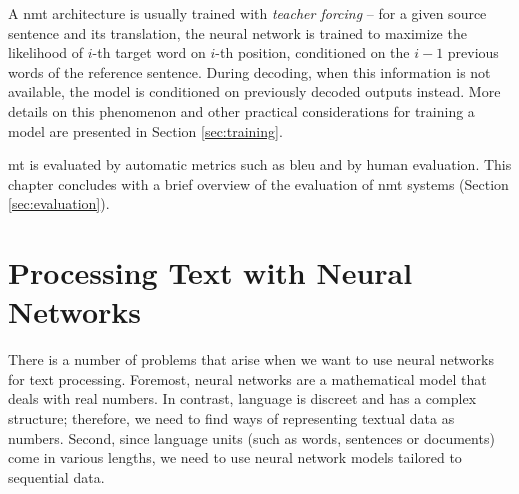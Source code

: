 A \gls{nmt} architecture is usually trained with \emph{teacher forcing} -- for
a given source sentence and its translation, the neural network is trained to
maximize the likelihood of $i$-th target word on $i$-th position, conditioned
on the $i-1$ previous words of the reference sentence. During decoding, when
this information is not available, the model is conditioned on previously
decoded outputs instead. More details on this phenomenon and other practical
considerations for training a model are presented in Section
\ref{sec:training}. 






\Gls{mt} is evaluated by automatic metrics such as \acrshort{bleu} and by human
evaluation. This chapter concludes with a brief overview of the evaluation of
\gls{nmt} systems (Section \ref{sec:evaluation}).





\section{Processing Text with Neural Networks}
\label{sec:text-processing}

There is a number of problems that
arise when we want to use neural networks for text processing. Foremost, neural
networks are a mathematical model that deals with real numbers. In contrast,
language is discreet and has a complex structure; therefore, we need to find
ways of representing textual data as numbers. Second, since language units (such
as words, sentences or documents) come in various lengths, we need to use neural
network models tailored to sequential data.

